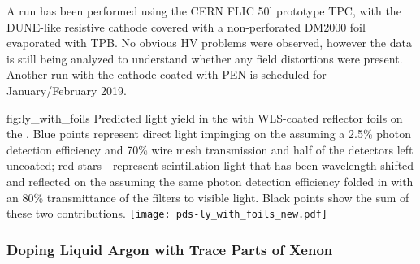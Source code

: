A run has been performed using the CERN FLIC 50l prototype TPC, with
the DUNE-like resistive cathode covered with a non-perforated DM2000
foil evaporated with TPB. No obvious HV problems were observed, however
the data is still being analyzed to understand whether any field
distortions were present.  Another run with the cathode coated with PEN
is scheduled for January/February 2019.



\begin{dunefigure}{fig:ly_with_foils}
{Predicted light yield in the  with WLS-coated reflector foils on the . Blue points represent direct  light impinging on the  assuming a 2.5\% photon detection efficiency and 70\% wire mesh transmission and half of the detectors left uncoated; red stars - represent scintillation light that has been wavelength-shifted and reflected on the  assuming the same photon detection efficiency folded in with an 80\% transmittance of the filters to visible light. Black points show the sum of these two contributions.}
\texttt{[image: pds-ly\_with\_foils\_new.pdf]}
\end{dunefigure}

\subsubsection{Doping Liquid Argon with Trace Parts of Xenon}
\label{sec:fdsp-pd-enh-xenon}


